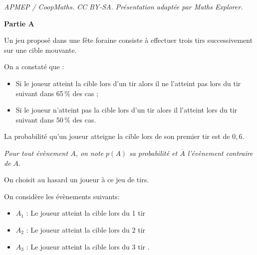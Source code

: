 \documentclass[10pt]{article}
\begin{document}
\noindent\textit{APMEP / CoopMaths. CC BY-SA. Présentation adaptée par Maths Explorer.}\par\medskip
\medskip

\textbf{Partie A}

\medskip

Un jeu proposé dans une fête foraine consiste à effectuer trois tirs successivement sur une cible mouvante.

On a constaté que :
\begin{itemize}
\item[$\bullet~~$] Si le joueur atteint la cible lors d'un tir alors il ne l'atteint pas lors du tir suivant dans 65\,\% des cas ;
\item[$\bullet~~$] Si le joueur n'atteint pas la cible lors d'un tir alors il l'atteint lors du tir suivant dans 50\,\% des cas.
\end{itemize}

La probabilité qu'un joueur atteigne la cible lors de son premier tir est de $0,6$.

\emph{Pour tout évènement $A$, on note $p(A)$ sa probabilité et $\overline{A}$ l'évènement contraire de $A$.}

On choisit au hasard un joueur à ce jeu de tirs.

On considère les évènements suivants:
\begin{itemize}
\item[$\bullet~~$] $A_1$ : \og Le joueur atteint la cible lors du 1 tir \fg
\item[$\bullet~~$] $A_2$ : \og Le joueur atteint la cible lors du 2 tir \fg
\item[$\bullet~~$] $A_3$ : \og Le joueur atteint la cible lors du 3 tir \fg.
\end{itemize}

\medskip
\end{document}

